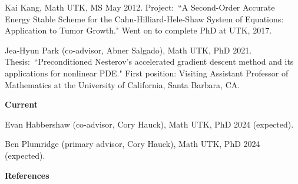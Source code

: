 \documentclass[11pt]{letter}
\begin{document}
\begin{description}
\begin{description}
	\item
Kai Kang, Math UTK, MS May 2012.  Project:~``A Second-Order Accurate Energy Stable Scheme for the Cahn-Hilliard-Hele-Shaw System of Equations: Application to Tumor Growth." Went on to complete PhD at UTK, 2017.

	\item
Jea-Hyun Park (co-advisor, Abner Salgado), Math UTK, PhD 2021.  Thesis:~``Preconditioned Nesterov's accelerated gradient descent method and its applications for nonlinear PDE." First position: Visiting Assistant Professor of Mathematics at the University of California, Santa Barbara, CA.
	\end{description}
	\item
{\Large\bf Current}
	\begin{description}	
	\item
Evan Habbershaw (co-advisor, Cory Hauck), Math UTK, PhD 2024 (expected).
	\item
Ben Plumridge (primary advisor, Cory Hauck), Math UTK, PhD 2024 (expected).
	\end{description}

	\end{description}

	\clearpage
	\newpage

{\LARGE\bf  References}
	
\end{document}
